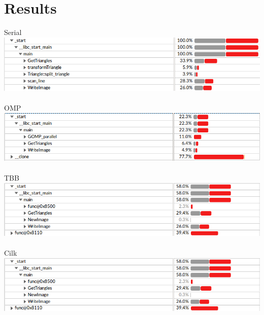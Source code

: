 \chapter*{Results}

Serial\\
\includegraphics[width=1\textwidth]{./pictures/serial.png}~\\

OMP\\
\includegraphics[width=1\textwidth]{./pictures/omp.png}~\\

TBB\\
\includegraphics[width=1\textwidth]{./pictures/cilk.png}~\\

Cilk\\
\includegraphics[width=1\textwidth]{./pictures/cilk.png}~\\
